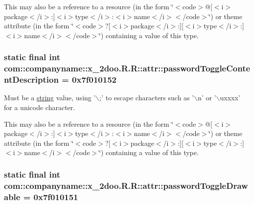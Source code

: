 This may also be a reference to a resource (in the form \char`\"{}$<$code$>$@\mbox{[}$<$i$>$package$<$/i$>$:\mbox{]}$<$i$>$type$<$/i$>$:$<$i$>$name$<$/i$>$$<$/code$>$\char`\"{}) or theme attribute (in the form \char`\"{}$<$code$>$?\mbox{[}$<$i$>$package$<$/i$>$:\mbox{]}\mbox{[}$<$i$>$type$<$/i$>$:\mbox{]}$<$i$>$name$<$/i$>$$<$/code$>$\char`\"{}) containing a value of this type. \hypertarget{classcom_1_1companyname_1_1x__2doo_1_1_r_1_1attr_c4ffe432a0a15b597d82f611a505e16a}{
\subsubsection[{passwordToggleContentDescription}]{\setlength{\rightskip}{0pt plus 5cm}static final int com::companyname::x\_\-2doo.R.R::attr::passwordToggleContentDescription = 0x7f010152}}
\label{classcom_1_1companyname_1_1x__2doo_1_1_r_1_1attr_c4ffe432a0a15b597d82f611a505e16a}


Must be a \hyperlink{classcom_1_1companyname_1_1x__2doo_1_1_r_1_1string}{string} value, using '$\backslash$;' to escape characters such as '$\backslash$n' or '$\backslash$uxxxx' for a unicode character. 

This may also be a reference to a resource (in the form \char`\"{}$<$code$>$@\mbox{[}$<$i$>$package$<$/i$>$:\mbox{]}$<$i$>$type$<$/i$>$:$<$i$>$name$<$/i$>$$<$/code$>$\char`\"{}) or theme attribute (in the form \char`\"{}$<$code$>$?\mbox{[}$<$i$>$package$<$/i$>$:\mbox{]}\mbox{[}$<$i$>$type$<$/i$>$:\mbox{]}$<$i$>$name$<$/i$>$$<$/code$>$\char`\"{}) containing a value of this type. \hypertarget{classcom_1_1companyname_1_1x__2doo_1_1_r_1_1attr_8b49d719a7def5b905dfe0643421f24d}{
\subsubsection[{passwordToggleDrawable}]{\setlength{\rightskip}{0pt plus 5cm}static final int com::companyname::x\_\-2doo.R.R::attr::passwordToggleDrawable = 0x7f010151}}
\label{classcom_1_1companyname_1_1x__2doo_1_1_r_1_1attr_8b49d719a7def5b905dfe0643421f24d}


